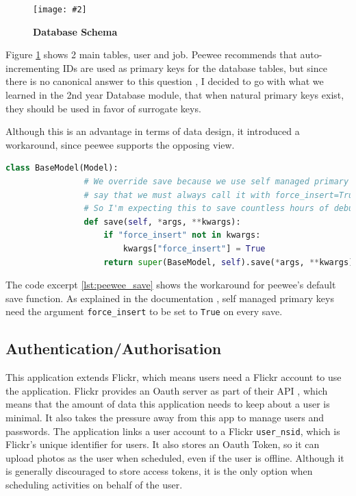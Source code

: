 \documentclass[10pt, a4paper]{article}
\newcommand{\figuremacro}[5]{
\begin{figure}[#1]
\centering
\texttt{[image: \#2]}
\caption[#3]{\textbf{#3}#4}
\label{fig:#2}
\end{figure}
}
\begin{document}
        \figuremacro{h}{db}{Database Schema}{}{0.6}

        Figure \ref{fig:db} shows 2 main tables, user and job. Peewee recommends that auto-incrementing IDs are used as primary keys for the database tables, but since there is no canonical answer to this question \cite{primary_key_choosing}, I decided to go with what we learned in the 2nd year Database module, that when natural primary keys exist, they should be used in favor of surrogate keys.

        Although this is an advantage in terms of data design, it introduced a workaround, since peewee supports the opposing view.
        \begin{lstlisting}[label=lst:peewee_save, language = Python, caption = Peewee save function workaround]
        class BaseModel(Model):
    			# We override save because we use self managed primary keys, and peewee docs
    			# say that we must always call it with force_insert=True when that is the case
    			# So I'm expecting this to save countless hours of debugging
    			def save(self, *args, **kwargs):
    			    if "force_insert" not in kwargs:
    			        kwargs["force_insert"] = True
    			    return super(BaseModel, self).save(*args, **kwargs)
        \end{lstlisting}
        The code excerpt \ref{lst:peewee_save} shows the workaround for peewee's default save function. As explained in the documentation \cite{peewee_pkeys}, self managed primary keys need the argument \texttt{force\_insert} to be set to \texttt{True} on every save.


        \subsection{Authentication/Authorisation}

        This application extends Flickr, which means users need a Flickr account to use the application. Flickr provides an Oauth \cite{oauth} server as part of their API \cite{Flickr_oauth}, which means that the amount of data this application needs to keep about a user is minimal. It also takes the pressure away from this app to manage users and passwords.
        The application links a user account to a Flickr \texttt{user\_nsid}, which is Flickr's unique identifier for users. It also stores an Oauth Token, so it can upload photos as the user when scheduled, even if the user is offline. Although it is generally discouraged to store access tokens, it is the only option when scheduling activities on behalf of the user.
\end{document}
